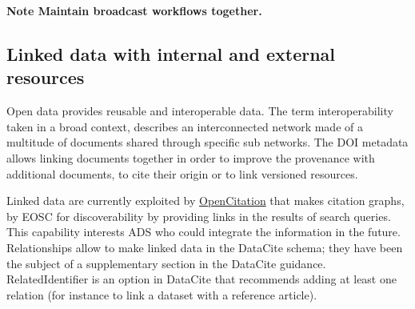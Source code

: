 \documentclass[11pt,a4paper]{ivoa}
\newcommand{\datacitedocurl}{https://datacite-metadata-schema.readthedocs.io/en/4.6}
\newcommand{\datacitepropurl}[1]{\datacitedocurl/properties/#1}
\newcommand{\important}[1]{\textbf{\color{ivoacolor}Note #1 \\ }}
\begin{document}
\important{Maintain broadcast workflows together. }

\subsection{Linked data with internal and external resources}\hypertarget{linked-data-with-internal-and-external-resources}{}\label{sec:linked-data-with-internal-and-external-resources}

Open data provides reusable and interoperable data. The term interoperability taken in a broad context, describes an interconnected network made of a multitude of documents shared through specific sub networks. The DOI metadata allows linking documents together in order to improve the provenance with additional documents, to cite their origin or to link versioned resources.

Linked data are currently exploited by \href{https://search.opencitations.net/}{OpenCitation} that makes citation graphs, by EOSC for discoverability by providing links in the results of search queries. This capability interests ADS who could integrate the information in the future.\\


Relationships allow to make linked data in the DataCite schema; they have been the subject of a supplementary section in the DataCite guidance. RelatedIdentifier is an option in DataCite that recommends adding at least one relation (for instance to link a dataset with a reference article).







\end{document}
